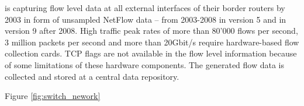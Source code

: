 \citet{switch} is capturing flow level data at all external interfaces of their border routers by 2003 in form of unsampled NetFlow data -- from 2003-2008 in version 5 and in version 9 after 2008\citep{Schatzmann:Tracing}.
High traffic peak rates of more than 80'000 flows per second, 3 million packets per second and more than 20Gbit/s require hardware-based flow collection cards. TCP flags are not available in the flow level information because of some limitations of these hardware components. The generated flow data is collected and stored at a central data repository.

Figure \ref{fig:switch_nework}

